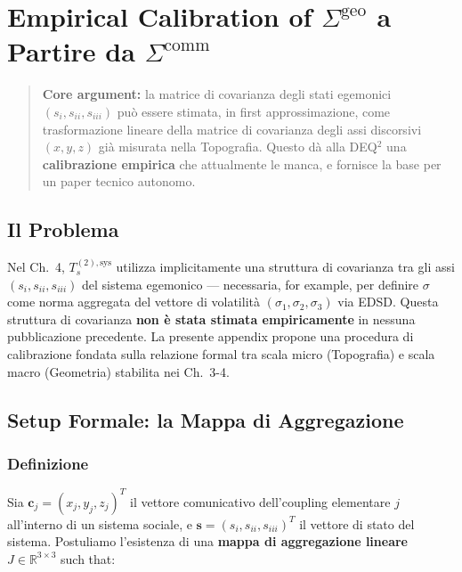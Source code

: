 \chapter{\texorpdfstring{Empirical Calibration of
\(\Sigma^{\text{geo}}\) a Partire da
\(\Sigma^{\text{comm}}\)}{Empirical Calibration of \textbackslash Sigma\^{}\{\textbackslash text\{geo\}\} a Partire da \textbackslash Sigma\^{}\{\textbackslash text\{comm\}\}}}\label{calibrazione-empirica-di-sigmatextgeo-a-partire-da-sigmatextcomm}

\begin{quote}
\textbf{Core argument:} la matrice di covarianza degli stati
egemonici \((s_i, s_{ii}, s_{iii})\) può essere stimata, in first
approssimazione, come trasformazione lineare della matrice di covarianza
degli assi discorsivi \((x, y, z)\) già misurata nella Topografia.
Questo dà alla DEQ$^2$ una \textbf{calibrazione empirica} che attualmente
le manca, e fornisce la base per un paper tecnico autonomo.
\end{quote}



\section{Il Problema}\label{il-problema}

Nel Ch.~4, \(T_s^{(2),\text{sys}}\) utilizza implicitamente una
struttura di covarianza tra gli assi \((s_i, s_{ii}, s_{iii})\) del
sistema egemonico --- necessaria, for example, per definire \(\sigma\)
come norma aggregata del vettore di volatilità
\((\sigma_1, \sigma_2, \sigma_3)\) via EDSD. Questa struttura di
covarianza \textbf{non è stata stimata empiricamente} in nessuna
pubblicazione precedente. La presente appendix propone una procedura di
calibrazione fondata sulla relazione formal tra scala micro
(Topografia) e scala macro (Geometria) stabilita nei Ch.~3-4.



\section{Setup Formale: la Mappa di
Aggregazione}\label{setup-formal-la-mappa-di-aggregazione}

\subsection{Definizione}\label{definition}

Sia \(\mathbf{c}_j = (x_j, y_j, z_j)^T\) il vettore comunicativo
dell'coupling elementare \(j\) all'interno di un sistema sociale, e
\(\mathbf{s} = (s_i, s_{ii}, s_{iii})^T\) il vettore di stato del
sistema. Postuliamo l'esistenza di una \textbf{mappa di aggregazione
lineare} \(J \in \mathbb{R}^{3 \times 3}\) such that:

